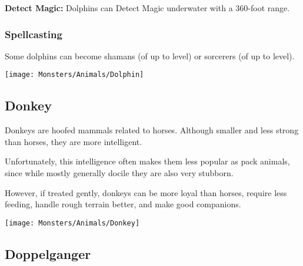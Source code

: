 \begin{multicols*}{2}
\textbf{Detect Magic:} Dolphins can Detect Magic underwater with a 360-foot range.

\subsubsection{Spellcasting}
Some dolphins can become shamans (of up to  level) or sorcerers (of up to  level).

\texttt{[image: Monsters/Animals/Dolphin]}

\subsection{Donkey}

Donkeys are hoofed mammals related to horses. Although smaller and less strong than horses, they are more intelligent.

Unfortunately, this intelligence often makes them less popular as pack animals, since while mostly generally docile they are also very stubborn.

However, if treated gently, donkeys can be more loyal than horses, require less feeding, handle rough terrain better, and make good companions.

\texttt{[image: Monsters/Animals/Donkey]}

\subsection{Doppelganger}
\end{multicols*}
